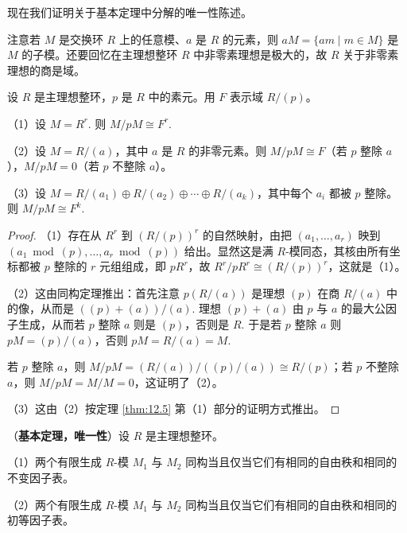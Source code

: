 现在我们证明关于基本定理中分解的唯一性陈述。

注意若 \(M\) 是交换环 \(R\) 上的任意模、\(a\) 是 \(R\) 的元素，则 \(aM = \{am \mid m \in M\}\) 是 \(M\) 的子模。还要回忆在主理想整环 \(R\) 中非零素理想是极大的，故 \(R\) 关于非零素理想的商是域。

\begin{lemma}\label{lem:12.8}
设 \(R\) 是主理想整环，\(p\) 是 \(R\) 中的素元。用 \(F\) 表示域 \(R/(p)\)。

（1）设 \(M = R^r\). 则 \(M/pM \cong F^r\).

（2）设 \(M = R/(a)\)，其中 \(a\) 是 \(R\) 的非零元素。则 \(M/pM \cong F\)（若 \(p\) 整除 \(a\)），\(M/pM = 0\)（若 \(p\) 不整除 \(a\)）。

（3）设 \(M = R/(a_1) \oplus R/(a_2) \oplus \cdots \oplus R/(a_k)\)，其中每个 \(a_i\) 都被 \(p\) 整除。则 \(M/pM \cong F^k\).
\end{lemma}

\begin{proof}
（1）存在从 \(R^r\) 到 \((R/(p))^r\) 的自然映射，由把 \((a_1, \ldots, a_r)\) 映到 \((a_1 \bmod (p), \ldots, a_r \bmod (p))\) 给出。显然这是满 \(R\)-模同态，其核由所有坐标都被 \(p\) 整除的 \(r\) 元组组成，即 \(pR^r\)，故 \(R^r/pR^r \cong (R/(p))^r\)，这就是（1）。

（2）这由同构定理推出：首先注意 \(p(R/(a))\) 是理想 \((p)\) 在商 \(R/(a)\) 中的像，从而是 \(((p)+(a))/(a)\). 理想 \((p)+(a)\) 由 \(p\) 与 \(a\) 的最大公因子生成，从而若 \(p\) 整除 \(a\) 则是 \((p)\)，否则是 \(R\). 于是若 \(p\) 整除 \(a\) 则 \(pM = (p)/(a)\)，否则 \(pM = R/(a) = M\).

若 \(p\) 整除 \(a\)，则 \(M/pM = (R/(a))/((p)/(a)) \cong R/(p)\)；若 \(p\) 不整除 \(a\)，则 \(M/pM = M/M = 0\)，这证明了（2）。

（3）这由（2）按定理 \ref{thm:12.5} 第（1）部分的证明方式推出。
\end{proof}

\begin{theorem}\label{thm:12.9}
（\textbf{基本定理，唯一性}）设 \(R\) 是主理想整环。

（1）两个有限生成 \(R\)-模 \(M_1\) 与 \(M_2\) 同构当且仅当它们有相同的自由秩和相同的不变因子表。

（2）两个有限生成 \(R\)-模 \(M_1\) 与 \(M_2\) 同构当且仅当它们有相同的自由秩和相同的初等因子表。
\end{theorem}


